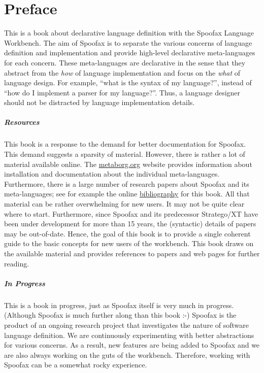 \chapter*{Preface}

This is a book about declarative language definition with the Spoofax Language
Workbench.
The aim of Spoofax is to separate the various concerns of language definition
and implementation and provide high-level declarative meta-languages for each
concern.
These meta-languages are declarative in the sense that they abstract from the
\emph{how} of language implementation and focus on the \emph{what} of language
design.
For example, ``what is the syntax of my language?'', instead of ``how do I
implement a parser for my language?''.
Thus, a language designer should not be distracted by language implementation
details. 

\paragraph{Resources}

This book is a response to the demand for better documentation for Spoofax. This
demand suggests a sparsity of material.
However, there is rather a lot of material available online. The
\href{http://metaborg.org}{metaborg.org} website provides information about
installation and documentation about the individual meta-languages. 
Furthermore, there is a large number of research papers about Spoofax and its
meta-languages; see for example the online
\href{http://researchr.org/bibliography/metaborg-book/publications}{bibliography}
for this book.
All that material can be rather overwhelming for new users. 
It may not be quite clear where to start.
Furthermore, since Spoofax and its predecessor Stratego/XT have been
under development for more than 15 years, the (syntactic) details of
papers may be out-of-date.
Hence, the goal of this book is to provide a single coherent guide to the basic
concepts for new users of the workbench.
This book draws on the available material and provides references to papers and
web pages for further reading.

\paragraph{In Progress}

This is a book in progress, just as Spoofax itself is very much in progress.
(Although Spoofax is much further along than this book :-) Spoofax is the
product of an ongoing research project that investigates the nature of software
language definition. We are continuously experimenting with better abstractions
for various concerns.
As a result, new features are being added to Spoofax and we are also always
working on the guts of the workbench.
Therefore, working with Spoofax can be a somewhat rocky experience.

